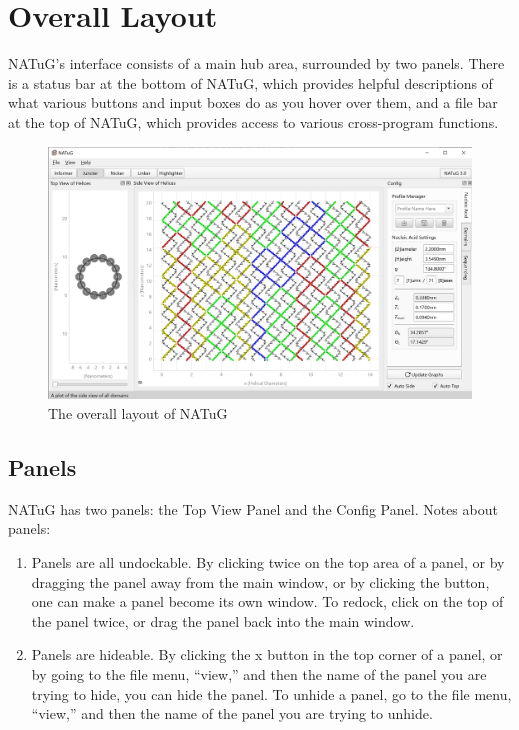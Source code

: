 \documentclass[titlepage]{article}
\begin{document}
	\section{Overall Layout}
	
	NATuG’s interface consists of a main hub area, surrounded by two panels. There is a status bar at the bottom of NATuG, which provides helpful descriptions of what various buttons and input boxes do as you hover over them, and a file bar at the top of NATuG, which provides access to various cross-program functions.
	
	\begin{figure}[h]
		\centering
		\caption{The overall layout of NATuG}
		\label{program-layout}
		\includegraphics[width=5in]{program-layout.png}
	\end{figure}

	\subsection{Panels} \label{sect:panels}
	NATuG has two panels: the Top View Panel and the Config Panel. Notes about panels:
	
	\begin{enumerate}
		\item Panels are all undockable. By clicking twice on the top area of a panel, or by dragging the panel away from the main window, or by clicking the  button, one can make a panel become its own window. To redock, click on the top of the panel twice, or drag the panel back into the main window. 
		\item Panels are hideable. By clicking the x button in the top corner of a panel, or by going to the file menu, “view,” and then the name of the panel you are trying to hide, you can hide the panel. To unhide a panel, go to the file menu, “view,” and then the name of the panel you are trying to unhide. 
	\end{enumerate}
\end{document}
